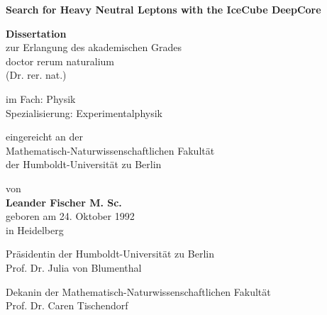 \thispagestyle{plain}
\begin{center}
	\vspace*{1cm}

	\LARGE
	\textbf{Search for Heavy Neutral Leptons with the IceCube DeepCore}
	\large

	\vspace{0.8cm}

	\textbf{Dissertation}\\
	zur Erlangung des akademischen Grades\\
	doctor rerum naturalium \\
	(Dr. rer. nat.) \\

	\vspace{0.5cm}

	im Fach: Physik \\
	Spezialisierung: Experimentalphysik\\

	\vspace{0.5cm}

	eingereicht an der \\
	Mathematisch-Naturwissenschaftlichen Fakultät\\
	der Humboldt-Universität zu Berlin\\

	\vspace{0.5cm}

	von\\
	\textbf{Leander Fischer M. Sc.}\\
	geboren am 24. Oktober 1992\\
	in Heidelberg

	\vspace{0.5cm}

	Präsidentin der Humboldt-Universität zu Berlin\\
	Prof. Dr. Julia von Blumenthal\\

	\vspace{0.5cm}

	Dekanin der Mathematisch-Naturwissenschaftlichen Fakultät\\
	Prof. Dr. Caren Tischendorf\\
\end{center}

\newpage
\thispagestyle{plain}

